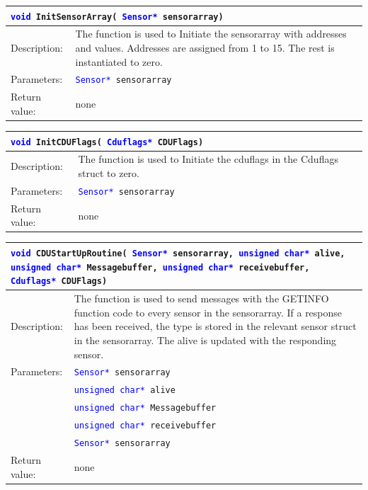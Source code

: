 \begin{table}[H]
\begin{tabular}{l p{12.5cm}}
\multicolumn{2}{l}{\texttt{\textcolor{blue}{void} InitSensorArray( \texttt{\textcolor{blue}{Sensor*} sensorarray})}} \\
\hline
Description:& The function is used to Initiate the sensorarray with addresses and values. Addresses are assigned from 1 to 15. The rest is instantiated to zero.\\
Parameters:&\texttt{\textcolor{blue}{Sensor*} sensorarray}\\
Return value:&none\\
\end{tabular}
\end{table}

\begin{table}[H]
\begin{tabular}{l p{12.5cm}}
\multicolumn{2}{l}{\texttt{\textcolor{blue}{void} InitCDUFlags( \texttt{\textcolor{blue}{Cduflags*} CDUFlags})}} \\
\hline
Description:& The function is used to Initiate the cduflags in the Cduflags struct to zero.\\
Parameters:&\texttt{\textcolor{blue}{Sensor*} sensorarray}\\
Return value:&none\\
\end{tabular}
\end{table}

\begin{table}[H]
\begin{tabular}{l p{12.5cm}}
\multicolumn{2}{p{15cm}}{\texttt{\textcolor{blue}{void} CDUStartUpRoutine( \texttt{\textcolor{blue}{Sensor*} sensorarray, \textcolor{blue}{unsigned char*} alive, \textcolor{blue}{unsigned char*} Messagebuffer, \textcolor{blue}{unsigned char*} receivebuffer, \textcolor{blue}{Cduflags*} CDUFlags})}} \\
\hline
Description:& The function is used to send messages with the GETINFO function code to every sensor in the sensorarray. If a response has been received, the type is stored in the relevant sensor struct in the sensorarray. The alive is updated with the responding sensor.\\
Parameters:&\texttt{\textcolor{blue}{Sensor*} sensorarray}\\
&\texttt{\textcolor{blue}{unsigned char*} alive}\\
&\texttt{\textcolor{blue}{unsigned char*} Messagebuffer}\\
&\texttt{\textcolor{blue}{unsigned char*} receivebuffer}\\
&\texttt{\textcolor{blue}{Sensor*} sensorarray}\\
Return value:&none\\
\end{tabular}
\end{table}

